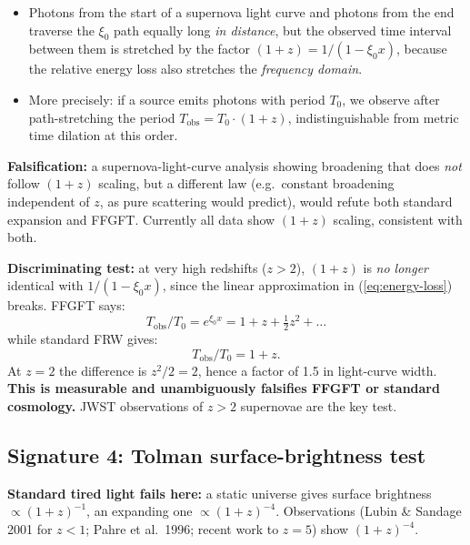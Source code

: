 \begin{itemize}[leftmargin=2em,itemsep=2pt,topsep=2pt]
  \item Photons from the start of a supernova light curve and photons
        from the end traverse the $\xi_0$ path equally long
        \emph{in distance}, but the observed time interval between
        them is stretched by the factor $(1+z) = 1/(1 - \xi_0 x)$,
        because the relative energy loss also stretches the
        \emph{frequency domain}.
  \item More precisely: if a source emits photons with period $T_0$,
        we observe after path-stretching the period
        $T_{\text{obs}} = T_0 \cdot (1+z)$, indistinguishable from
        metric time dilation at this order.
\end{itemize}

\textbf{Falsification:} a supernova-light-curve analysis showing
broadening that does \emph{not} follow $(1+z)$ scaling, but a
different law (e.g.\ constant broadening independent of $z$, as pure
scattering would predict), would refute both standard expansion and
FFGFT. Currently all data show $(1+z)$ scaling, consistent with both.

\textbf{Discriminating test:} at very high redshifts ($z > 2$),
$(1+z)$ is \emph{no longer} identical with $1/(1 - \xi_0 x)$, since
the linear approximation in (\ref{eq:energy-loss}) breaks. FFGFT says:
\begin{equation}
  T_{\text{obs}}/T_0 = e^{\xi_0 x} = 1 + z + \tfrac{1}{2}z^2 + \ldots
\end{equation}
while standard FRW gives:
\begin{equation}
  T_{\text{obs}}/T_0 = 1 + z.
\end{equation}
At $z = 2$ the difference is $z^2/2 = 2$, hence a factor of 1.5 in
light-curve width. \textbf{This is measurable and unambiguously
falsifies FFGFT or standard cosmology.} JWST observations of $z > 2$
supernovae are the key test.

\subsection{Signature 4: Tolman surface-brightness test}

\textbf{Standard tired light fails here:} a static universe gives
surface brightness $\propto (1+z)^{-1}$, an expanding one
$\propto (1+z)^{-4}$. Observations (Lubin \& Sandage 2001 for $z < 1$;
Pahre et al.\ 1996; recent work to $z = 5$) show $(1+z)^{-4}$.

